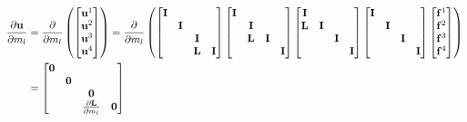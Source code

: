 \documentclass[revised,endfloat]{geophysics}
\begin{document}
\begin{equation}
\begin{split}
\frac{\partial {\bf u}}{\partial m_l} &= \frac{\partial }{\partial m_l} \left(\begin{bmatrix}
{\bf u}^1 \\
{\bf u}^2 \\
{\bf u}^3 \\
{\bf u}^4 \\
\end{bmatrix} \right)
=
\frac{\partial }{\partial m_l} \left(
\begin{bmatrix}
{\bf I} & & & \\
 & {\bf I} & & \\
 & &  {\bf I}& \\
 & & {\bf L}& {\bf I} \\
\end {bmatrix}
\begin{bmatrix}
{\bf I} & & & \\
 & {\bf I} & & \\
 & {\bf L} &  {\bf I}& \\
 & & & {\bf I} \\
\end {bmatrix}
\begin{bmatrix}
{\bf I} & & & \\
{\bf L} & {\bf I} & & \\
 & &  {\bf I}& \\
 & & & {\bf I} \\
\end {bmatrix}
\begin{bmatrix}
{\bf I} & & & \\
& {\bf I} & & \\
 & &  {\bf I}& \\
 & & & {\bf I} \\
\end {bmatrix}
\begin{bmatrix}
{\bf f}^1 \\
{\bf f}^2 \\
{\bf f}^3 \\
{\bf f}^4 \\
\end{bmatrix} \right) \\
&= \begin{bmatrix}
{\bf 0} & & & \\
 & {\bf 0} & & \\
 & &  {\bf 0}& \\
 & & \frac{\partial {\bf L}}{\partial m_l}& {\bf 0} \\

\end{bmatrix}
\end{split}
\end{equation}
\end{document}
